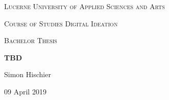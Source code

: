 \begin{titlepage}
\centering
\vspace{1cm}
	{\scshape\LARGE Lucerne University of Applied Sciences and Arts \par}
	\vspace{1cm}
	{\scshape\Large Course of Studies Digital Ideation \par}
	
	{\scshape\Large Bachelor Thesis\par}
	\vspace{1.5cm}
	{\huge\bf TBD\par}
	
	\vspace{10cm}
	{\Large Simon Hischier\par}
	\vfill

	{\large 09 April 2019\par}
\end{titlepage}